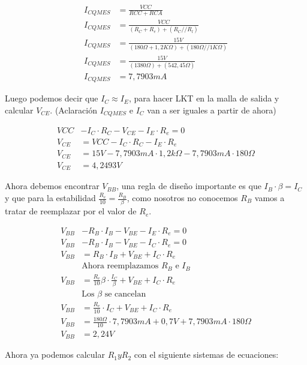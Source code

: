 \begin{multicols}{2}
			\begin{align*}
				I_{CQMES}&=\frac{VCC}{RCC+RCA}\\
				I_{CQMES}&=\frac{VCC}{(R_C + R_e)+(R_C // R_l)}\\
				I_{CQMES}&=\frac{15 V}{(180 \Omega + 1,2 K\Omega)+( 180 \Omega// 1 K\Omega)}\\
				I_{CQMES}&=\frac{15 V}{(1380 \Omega)+(542,45 \Omega)}\\
				I_{CQMES}&=7,7903 mA
			\end{align*}

			\sangria{}Luego podemos decir que $I_C \approx I_E$, para hacer LKT en la malla de salida y calcular $V_{CE}$. (Aclaración $I_{CQMES}$ e $I_C$ van a ser iguales a partir de ahora)

			 \begin{align*}
			 	VCC &- I_C \cdot  R_C - V_{CE} - I_E \cdot R_e = 0\\
			 	V_{CE} &= VCC - I_C \cdot  R_C - I_E \cdot R_e\\
			 	V_{CE} &= 15 V - 7,7903 mA \cdot  1,2 k\Omega - 7,7903 mA \cdot 180 \Omega\\
			 	V_{CE} &= 4,2493 V
			 \end{align*}

			\sangria{}Ahora debemos encontrar $V_{BB}$, una regla de diseño importante es que $I_B \cdot \beta = I_C$ y que para la estabilidad $\frac{R_e}{10}=\frac{R_B}{\beta}$, como nosotros no conocemos $R_B$ vamos a tratar de reemplazar por el valor de $R_e$.

			\begin{align*}
				V_{BB} &- R_B \cdot I_B - V_{BE} - I_E \cdot R_e = 0\\
				V_{BB} &- R_B \cdot I_B - V_{BE} - I_C \cdot R_e = 0\\
				V_{BB} &= R_B \cdot I_B + V_{BE} + I_C \cdot R_e\\
				&\text{Ahora reemplazamos $R_B$ e $I_B$}\\
				V_{BB} &= \frac{R_e}{10}\beta \cdot \frac{I_C}{\beta} + V_{BE} + I_C \cdot R_e\\
				&\text{Los $\beta$ se cancelan}\\
				V_{BB} &=\frac{R_e}{10} \cdot {I_C} + V_{BE} + I_C \cdot R_e\\
				V_{BB} &=\frac{180 \Omega}{10} \cdot {7,7903 mA} + 0,7 V + 7,7903 mA \cdot 180 \Omega\\
				V_{BB} &= 2,24 V
			\end{align*}

			\sangria{}Ahora ya podemos calcular $R_1 y R_2$ con el siguiente sistemas de ecuaciones:


\end{multicols}
